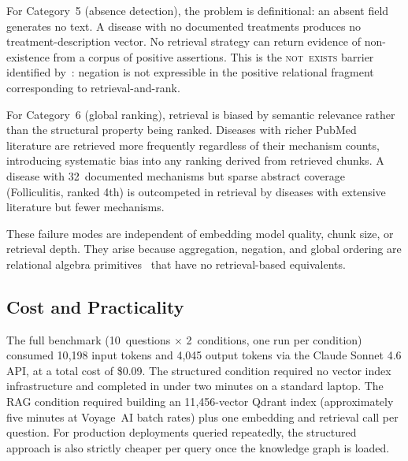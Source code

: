 For Category~5 (absence detection), the problem is definitional: an absent
field generates no text. A disease with no documented treatments produces no
treatment-description vector. No retrieval strategy can return evidence of
non-existence from a corpus of positive assertions. This is the
\textsc{not~exists} barrier identified by~\citet{vardi1982complexity}: negation
is not expressible in the positive relational fragment corresponding to
retrieval-and-rank.

For Category~6 (global ranking), retrieval is biased by semantic relevance
rather than the structural property being ranked. Diseases with richer PubMed
literature are retrieved more frequently regardless of their mechanism counts,
introducing systematic bias into any ranking derived from retrieved chunks.
A disease with 32~documented mechanisms but sparse abstract coverage
(Folliculitis, ranked 4th) is outcompeted in retrieval by diseases with
extensive literature but fewer mechanisms.

These failure modes are independent of embedding model quality, chunk size, or
retrieval depth. They arise because aggregation, negation, and global ordering
are relational algebra primitives~\citep{codd1970relational,vardi1982complexity}
that have no retrieval-based equivalents.

\subsection{Cost and Practicality}
\label{sec:results-cost}

The full benchmark (10~questions $\times$ 2~conditions, one run per condition)
consumed 10{,}198 input tokens and 4{,}045 output tokens via the Claude Sonnet
4.6 API, at a total cost of \$0.09. The structured condition required no vector
index infrastructure and completed in under two minutes on a standard laptop.
The RAG condition required building an 11{,}456-vector Qdrant index
(approximately five minutes at Voyage~AI batch rates) plus one embedding and
retrieval call per question. For production deployments queried repeatedly, the
structured approach is also strictly cheaper per query once the knowledge graph
is loaded.
